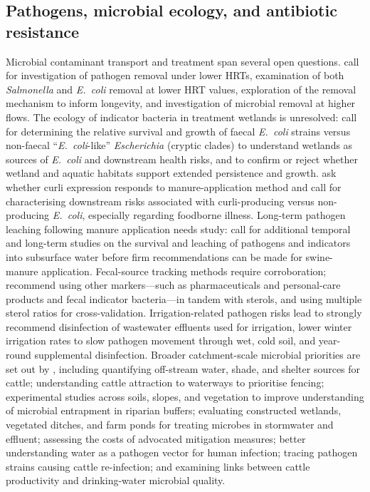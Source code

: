 \subsection{Pathogens, microbial ecology, and antibiotic resistance}
Microbial contaminant transport and treatment span several open questions. \textcite{Soupir2018} call for investigation of pathogen removal under lower HRTs, examination of both \textit{Salmonella} and \textit{E.\ coli} removal at lower HRT values, exploration of the removal mechanism to inform longevity, and investigation of microbial removal at higher flows. The ecology of indicator bacteria in treatment wetlands is unresolved: \textcite{Stott2023} call for determining the relative survival and growth of faecal \textit{E.\ coli} strains versus non-faecal ``\textit{E.\ coli}-like'' \textit{Escherichia} (cryptic clades) to understand wetlands as sources of \textit{E.\ coli} and downstream health risks, and to confirm or reject whether wetland and aquatic habitats support extended persistence and growth. \textcite{Truhlar2015} ask whether curli expression responds to manure-application method and call for characterising downstream risks associated with curli-producing versus non-producing \textit{E.\ coli}, especially regarding foodborne illness. Long-term pathogen leaching following manure application needs study: \textcite{Malik2004} call for additional temporal and long-term studies on the survival and leaching of pathogens and indicators into subsurface water before firm recommendations can be made for swine-manure application. Fecal-source tracking methods require corroboration; \textcite{Gottschall2013} recommend using other markers---such as pharmaceuticals and personal-care products and fecal indicator bacteria---in tandem with sterols, and using multiple sterol ratios for cross-validation. Irrigation-related pathogen risks lead \textcite{Ding2021} to strongly recommend disinfection of wastewater effluents used for irrigation, lower winter irrigation rates to slow pathogen movement through wet, cold soil, and year-round supplemental disinfection. Broader catchment-scale microbial priorities are set out by \textcite{Collins2007}, including quantifying off-stream water, shade, and shelter sources for cattle; understanding cattle attraction to waterways to prioritise fencing; experimental studies across soils, slopes, and vegetation to improve understanding of microbial entrapment in riparian buffers; evaluating constructed wetlands, vegetated ditches, and farm ponds for treating microbes in stormwater and effluent; assessing the costs of advocated mitigation measures; better understanding water as a pathogen vector for human infection; tracing pathogen strains causing cattle re-infection; and examining links between cattle productivity and drinking-water microbial quality.

